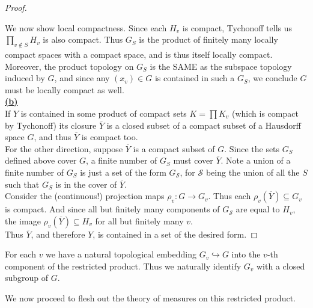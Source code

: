 \documentclass[11pt, x11names, openany]{book}
\newcommand{\fans}{\mathscr{S}}
\newcommand{\inj}{\hookrightarrow}
\renewcommand{\bar}[1]{\overline{#1}}
\begin{document}
\begin{proof}
\begin{warning}
\end{warning}
We now show local compactness. Since each $H_v$ is compact, Tychonoff tells us $\prod_{v \notin S} H_v$ is also compact. Thus $G_S$ is the product of finitely many locally compact spaces with a compact space, and is thus itself locally compact. Moreover, the product topology on $G_S$ is the SAME as the subspace topology induced by $G$, and since any $(x_v) \in G$ is contained in such a $G_S$, we conclude $G$ must be locally compact as well.\\

\textbf{\underline{(b)}}\\
If $Y$ is contained in some product of compact sets $ K = \prod K_v$ (which is compact by Tychonoff) its closure $\bar{Y}$ is a closed subset of a compact subset of a Hausdorff space $G$, and thus $\bar{Y}$ is compact too.\\
For the other direction, suppose $\bar{Y}$ is a compact subset of $G$. Since the sets $G_S$ defined above cover $G$, a finite number of $G_S$ must cover $\bar{Y}$. Note a union of a finite number of $G_S$ is just a set of the form $G_{\fans}$, for $\fans$ being the union of all the $S$ such that $G_S$ is in the cover of $\bar{Y}$.\\
Consider the (continuous!) projection maps $\rho_v: G \to G_v$. Thus each $\rho_v(\bar{Y}) \subseteq G_v$ is compact. And since all but finitely many components of $G_{\fans}$ are equal to $H_v$, the image $\rho_v(\bar{Y}) \subseteq H_v$ for all but finitely many $v$.\\
Thus $\bar{Y}$, and therefore $Y$, is contained in a set of the desired form.
\end{proof}

\begin{observation}
    For each $v$ we have a natural topological embedding $G_v \inj G$ into the $v$-th component of the restricted product. Thus we naturally identify $G_v$ with a closed subgroup of $G$.
\end{observation}


We now proceed to flesh out the theory of measures on this restricted product.
\end{document}
